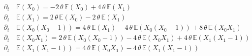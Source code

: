\documentclass[10pt]{article}
\begin{document}
\begin{align*}\partial_t\,&\mathbb{E}(X_0) = -2\,\theta\,\mathbb{E}(X_0) + 4\,\theta\,\mathbb{E}(X_1)\\
\partial_t\,&\mathbb{E}(X_1) = 2\,\theta\,\mathbb{E}(X_0) - 2\,\theta\,\mathbb{E}(X_1)\\
\partial_t\,&\mathbb{E}(X_0(X_0-1)) = 4\,\theta\,\mathbb{E}(X_1) - 4\,\theta\,\mathbb{E}(X_0(X_0-1)) + 8\,\theta\,\mathbb{E}(X_0 X_1)\\
\partial_t\,&\mathbb{E}(X_0 X_1) = 2\,\theta\,\mathbb{E}(X_0(X_0-1)) - 4\,\theta\,\mathbb{E}(X_0 X_1) + 4\,\theta\,\mathbb{E}(X_1(X_1-1))\\
\partial_t\,&\mathbb{E}(X_1(X_1-1)) = 4\,\theta\,\mathbb{E}(X_0 X_1) - 4\,\theta\,\mathbb{E}(X_1(X_1-1))\end{align*}
\end{document}
